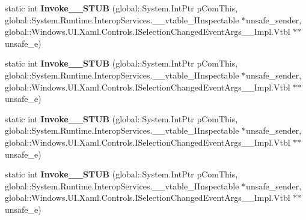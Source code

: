 \begin{DoxyCompactItemize}
\item 
\mbox{\label{struct_windows_1_1_u_i_1_1_xaml_1_1_controls_1_1_selection_changed_event_handler_____impl_1_1_vtbl_ae17163bc26cb1925dcb05040735769e6}} 
static int {\bfseries Invoke\+\_\+\+\_\+\+S\+T\+UB} (global\+::\+System.\+Int\+Ptr p\+Com\+This, global\+::\+System.\+Runtime.\+Interop\+Services.\+\_\+\+\_\+vtable\+\_\+\+I\+Inspectable $\ast$unsafe\+\_\+sender, global\+::\+Windows.\+U\+I.\+Xaml.\+Controls.\+I\+Selection\+Changed\+Event\+Args\+\_\+\+\_\+\+Impl.\+Vtbl $\ast$$\ast$unsafe\+\_\+e)
\item 
\mbox{\label{struct_windows_1_1_u_i_1_1_xaml_1_1_controls_1_1_selection_changed_event_handler_____impl_1_1_vtbl_ae17163bc26cb1925dcb05040735769e6}} 
static int {\bfseries Invoke\+\_\+\+\_\+\+S\+T\+UB} (global\+::\+System.\+Int\+Ptr p\+Com\+This, global\+::\+System.\+Runtime.\+Interop\+Services.\+\_\+\+\_\+vtable\+\_\+\+I\+Inspectable $\ast$unsafe\+\_\+sender, global\+::\+Windows.\+U\+I.\+Xaml.\+Controls.\+I\+Selection\+Changed\+Event\+Args\+\_\+\+\_\+\+Impl.\+Vtbl $\ast$$\ast$unsafe\+\_\+e)
\item 
\mbox{\label{struct_windows_1_1_u_i_1_1_xaml_1_1_controls_1_1_selection_changed_event_handler_____impl_1_1_vtbl_ae17163bc26cb1925dcb05040735769e6}} 
static int {\bfseries Invoke\+\_\+\+\_\+\+S\+T\+UB} (global\+::\+System.\+Int\+Ptr p\+Com\+This, global\+::\+System.\+Runtime.\+Interop\+Services.\+\_\+\+\_\+vtable\+\_\+\+I\+Inspectable $\ast$unsafe\+\_\+sender, global\+::\+Windows.\+U\+I.\+Xaml.\+Controls.\+I\+Selection\+Changed\+Event\+Args\+\_\+\+\_\+\+Impl.\+Vtbl $\ast$$\ast$unsafe\+\_\+e)
\item 
\mbox{\label{struct_windows_1_1_u_i_1_1_xaml_1_1_controls_1_1_selection_changed_event_handler_____impl_1_1_vtbl_ae17163bc26cb1925dcb05040735769e6}} 
static int {\bfseries Invoke\+\_\+\+\_\+\+S\+T\+UB} (global\+::\+System.\+Int\+Ptr p\+Com\+This, global\+::\+System.\+Runtime.\+Interop\+Services.\+\_\+\+\_\+vtable\+\_\+\+I\+Inspectable $\ast$unsafe\+\_\+sender, global\+::\+Windows.\+U\+I.\+Xaml.\+Controls.\+I\+Selection\+Changed\+Event\+Args\+\_\+\+\_\+\+Impl.\+Vtbl $\ast$$\ast$unsafe\+\_\+e)

\end{DoxyCompactItemize}
